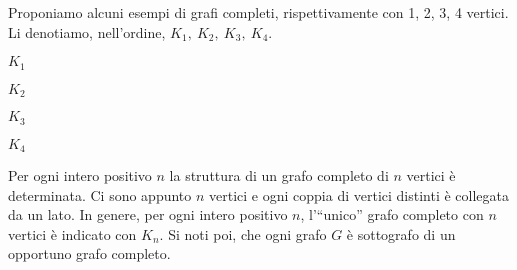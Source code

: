 \begin{example}
    Proponiamo alcuni esempi di grafi completi, rispettivamente con 1, 2, 3, 4 vertici. Li denotiamo, nell'ordine, $K_{1},\ K_{2},\ K_{3},\ K_{4}$.
    \begin{center}
    \begin{minipage}{.2\textwidth}
        \centering

        $K_{1}$
    \end{minipage}
    \begin{minipage}{.2\textwidth}
        \centering

        $K_{2}$
    \end{minipage}
    \begin{minipage}{.2\textwidth}
        \centering

        $K_{3}$
    \end{minipage}
    \begin{minipage}{.2\textwidth}
        \centering

        $K_{4}$
    \end{minipage}
\end{center}	Per ogni intero positivo $n$ la struttura di un grafo completo di $n$ vertici è determinata. Ci sono appunto $n$ vertici e ogni coppia di vertici distinti è collegata da un lato. In genere, per ogni intero positivo $n$, l'``unico'' grafo completo con $n$ vertici è indicato con $K_{n}$. Si noti poi, che ogni grafo $G$ è sottografo di un opportuno grafo completo.
\end{example}

